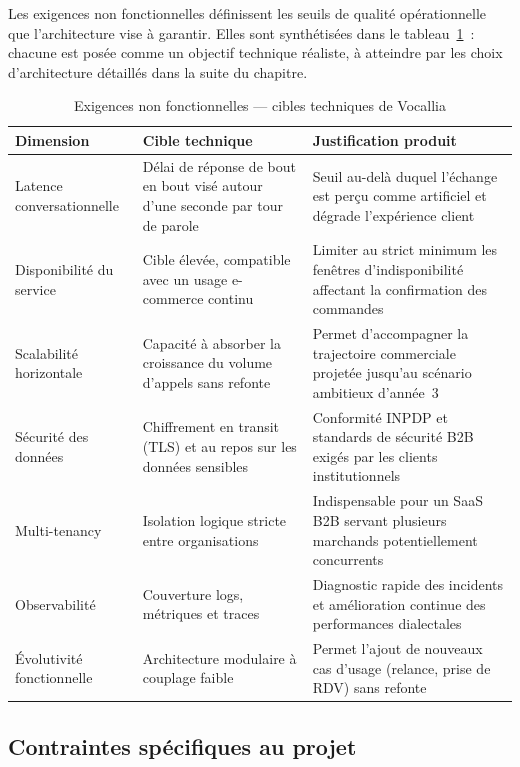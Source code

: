 Les exigences non fonctionnelles définissent les seuils de qualité opérationnelle que l'architecture vise à garantir. Elles sont synthétisées dans le tableau~\ref{tab:exigences_nf}~: chacune est posée comme un objectif technique réaliste, à atteindre par les choix d'architecture détaillés dans la suite du chapitre.

\begin{table}[H]
\centering
\caption{Exigences non fonctionnelles — cibles techniques de Vocallia}
\label{tab:exigences_nf}
\begin{tabular}{|p{4cm}|p{5cm}|p{5cm}|}
\hline
\textbf{Dimension} & \textbf{Cible technique} & \textbf{Justification produit} \\
\hline
Latence conversationnelle & Délai de réponse de bout en bout visé autour d'une seconde par tour de parole & Seuil au-delà duquel l'échange est perçu comme artificiel et dégrade l'expérience client \\
\hline
Disponibilité du service & Cible élevée, compatible avec un usage e-commerce continu & Limiter au strict minimum les fenêtres d'indisponibilité affectant la confirmation des commandes \\
\hline
Scalabilité horizontale & Capacité à absorber la croissance du volume d'appels sans refonte & Permet d'accompagner la trajectoire commerciale projetée jusqu'au scénario ambitieux d'année~3 \\
\hline
Sécurité des données & Chiffrement en transit (TLS) et au repos sur les données sensibles & Conformité INPDP et standards de sécurité B2B exigés par les clients institutionnels \\
\hline
Multi-tenancy & Isolation logique stricte entre organisations & Indispensable pour un SaaS B2B servant plusieurs marchands potentiellement concurrents \\
\hline
Observabilité & Couverture logs, métriques et traces & Diagnostic rapide des incidents et amélioration continue des performances dialectales \\
\hline
Évolutivité fonctionnelle & Architecture modulaire à couplage faible & Permet l'ajout de nouveaux cas d'usage (relance, prise de RDV) sans refonte \\
\hline
\end{tabular}
\end{table}

\subsection{Contraintes spécifiques au projet}
\label{subsec:contraintes_projet}

